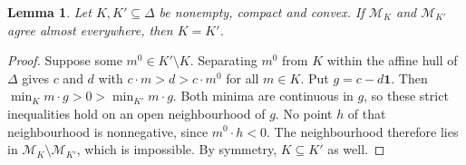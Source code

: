 \documentclass[11pt]{article}
\newtheorem{lemma}[theorem]{Lemma}
\theoremstyle{remark}\newtheorem{remark}[theorem]{Remark}
\newcommand{\M}{\mathcal M}
\newcommand{\one}{\mathbf 1}
\begin{document}
\begin{lemma}\label{lem:ident}
Let $K,K'\subseteq\Delta$ be nonempty, compact and convex. If $\M_K$ and
$\M_{K'}$ agree almost everywhere, then $K=K'$.
\end{lemma}
\begin{proof}
Suppose some $m^0\in K'\setminus K$. Separating $m^0$ from $K$ within the
affine hull of $\Delta$ gives $c$ and $d$ with $c\cdot m>d>c\cdot m^0$ for
all $m\in K$. Put $g=c-d\one$. Then $\min_Km\cdot g>0>\min_{K'}m\cdot g$.
Both minima are continuous in $g$, so these strict inequalities hold on an
open neighbourhood of $g$. No point $h$ of that neighbourhood is
nonnegative, since $m^0\cdot h<0$. The neighbourhood therefore lies in
$\M_K\setminus\M_{K'}$, which is impossible. By symmetry, $K\subseteq K'$
as well.
\end{proof}
\end{document}
